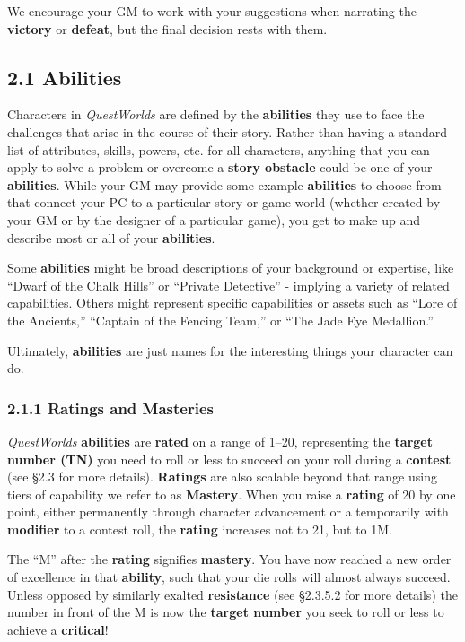 \documentclass[
]{article}
\begin{document}
We encourage your GM to work with your suggestions when narrating the
\textbf{victory} or \textbf{defeat}, but the final decision rests with
them.

\hypertarget{abilities}{%
\subsection{2.1 Abilities}\label{abilities}}

Characters in \emph{QuestWorlds} are defined by the \textbf{abilities}
they use to face the challenges that arise in the course of their story.
Rather than having a standard list of attributes, skills, powers, etc.
for all characters, anything that you can apply to solve a problem or
overcome a \textbf{story obstacle} could be one of your
\textbf{abilities}. While your GM may provide some example
\textbf{abilities} to choose from that connect your PC to a particular
story or game world (whether created by your GM or by the designer of a
particular game), you get to make up and describe most or all of your
\textbf{abilities}.

Some \textbf{abilities} might be broad descriptions of your background
or expertise, like ``Dwarf of the Chalk Hills'' or ``Private Detective''
- implying a variety of related capabilities. Others might represent
specific capabilities or assets such as ``Lore of the Ancients,''
``Captain of the Fencing Team,'' or ``The Jade Eye Medallion.''

Ultimately, \textbf{abilities} are just names for the interesting things
your character can do.

\hypertarget{ratings-and-masteries}{%
\subsubsection{2.1.1 Ratings and
Masteries}\label{ratings-and-masteries}}

\emph{QuestWorlds} \textbf{abilities} are \textbf{rated} on a range of
1--20, representing the \textbf{target number (TN)} you need to roll or
less to succeed on your roll during a \textbf{contest} (see §2.3 for
more details). \textbf{Ratings} are also scalable beyond that range
using tiers of capability we refer to as \textbf{Mastery}. When you
raise a \textbf{rating} of 20 by one point, either permanently through
character advancement or a temporarily with \textbf{modifier} to a
contest roll, the \textbf{rating} increases not to 21, but to 1M.

The ``M'' after the \textbf{rating} signifies \textbf{mastery}. You have
now reached a new order of excellence in that \textbf{ability}, such
that your die rolls will almost always succeed. Unless opposed by
similarly exalted \textbf{resistance} (see §2.3.5.2 for more details)
the number in front of the M is now the \textbf{target number} you seek
to roll or less to achieve a \textbf{critical}!
\end{document}
